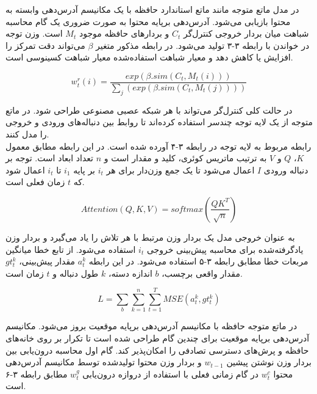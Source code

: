 در مدل ماتع متوجه مانند ماتع استاندارد حافظه با یک مکانیسم آدرس‌دهی وابسته به محتوا بازیابی می‌شود. آدرس‌دهی برپایه محتوا به صورت ضروری یک گام محاسبه شباهت میان بردار خروجی کنترل‌گر $C_t$ و بردارهای حافظه موجود $M_t$ است. وزن توجه در خواندن با رابطه ۳-۳ تولید می‌شود. در رابطه مذکور متغیر $\beta$ می‌تواند دقت تمرکز را افزایش یا کاهش دهد و معیار شباهت استفاده‌شده معیار شباهت کسینوسی است.\cite{zhao2020cold}

\begin{equation}
w_t^r(i) = \frac{exp(\beta.sim(C_t,M_t(i)))}{\sum_j(exp(\beta.sim(C_t,M_t(j))))}
\end{equation}

در حالت کلی کنترل‌گر می‌تواند با هر شبکه عصبی مصنوعی طراحی شود. در ماتع متوجه از یک لایه توجه چندسر استفاده کرده‌اند تا روابط بین دنباله‌های ورودی و خروجی را مدل کنند. \cite{zhao2020cold}
\\

رابطه مربوط به لایه توجه در رابطه ۳-۴ آورده شده است. در این رابطه مطابق معمول $K$، $Q$ و $V$ به ترتیب ماتریس کوئری، کلید و مقدار است و $n$ تعداد ابعاد است. توجه بر دنباله ورودی $I$ اعمال می‌شود تا یک جمع وزن‌دار برای هر $i_t$ بر پایه $i_1$ تا $i_t$ اعمال شود که $t$ زمان فعلی است.\cite{zhao2020cold} 

\begin{equation}
Attention(Q,K,V) = softmax(\frac{QK^T}{\sqrt{n}})
\end{equation}

به عنوان خروجی مدل یک بردار وزن مرتبط با هر تلاش را یاد می‌گیرد و بردار وزن یادگرفته‌شده برای محاسبه پیش‌بینی خروجی $i_t$ استفاده می‌شود. از تابع خطا میانگین مربعات خطا مطابق رابطه ۳-۵ استفاده می‌شود. در این رابطه $a_t^k$ مقدار پیش‌بینی، $gt_t^k$ مقدار واقعی برچسب، $b$ اندازه دسته، $k$ طول دنباله و $t$ زمان است.\cite{zhao2020cold}

\begin{equation}
L = \sum_b \sum_{k=1}^n \sum_{t=1}^T MSE(a_t^k, gt_t^k)
\end{equation}

در ماتع متوجه حافظه با مکانیسم آدرس‌دهی برپایه موقعیت بروز می‌شود. مکانیسم آدرس‌دهی برپایه موقعیت برای چندین گام طراحی شده است تا تکرار بر روی خانه‌های حافظه و پرش‌های دسترسی تصادفی را امکان‌پذیر کند. گام اول محاسبه درون‌یابی بین بردار وزن نوشتن پیشین $w_{t-1}$ و بردار وزن محتوا تولیدشده توسط مکانیسم آدرس‌دهی محتوا $w_t^c$ در گام زمانی فعلی با استفاده از دروازه درون‌یابی $w_t^g$ مطابق رابطه ۳-۶ است.\cite{zhao2020cold}

